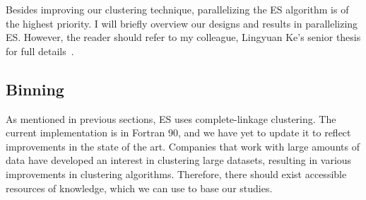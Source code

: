 Besides improving our clustering technique, parallelizing the ES algorithm is of the highest priority.
I will briefly overview our designs and results in parallelizing ES.
However, the reader should refer to my colleague, Lingyuan Ke's senior thesis for full details~\cite{lingThesis}.
\subsection*{Binning}
As mentioned in previous sections, ES uses complete-linkage clustering.
The current implementation is in Fortran 90, and we have yet to update it to reflect improvements in the state of the art.
Companies that work with large amounts of data have developed an interest in clustering large datasets, resulting in various improvements in clustering algorithms.
Therefore, there should exist accessible resources of knowledge, which we can use to base our studies.

